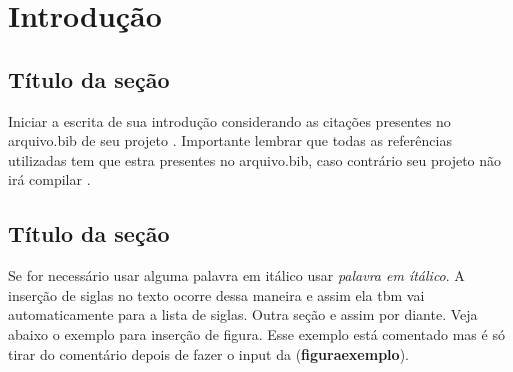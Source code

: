 
\chapter{Introdução}

\section{Título da seção}
Iniciar a escrita de sua introdução considerando as citações presentes no arquivo.bib de seu projeto \cite{Hagen2000TheBioinformatics}. Importante lembrar que todas as referências utilizadas tem que estra presentes no arquivo.bib, caso contrário seu projeto não irá compilar \cite{Hillmer2015SystemsBiologists}. 

\section{Título da seção}
Se for necessário usar alguma palavra em itálico usar \textit{palavra em ítálico}. A inserção de siglas no texto ocorre dessa maneira  e assim ela tbm vai automaticamente para a lista de siglas.
Outra seção e assim por diante. Veja abaixo o exemplo para inserção de figura. Esse exemplo está comentado mas é só tirar do comentário depois de fazer o input da  (\textbf{figuraexemplo}).



 


